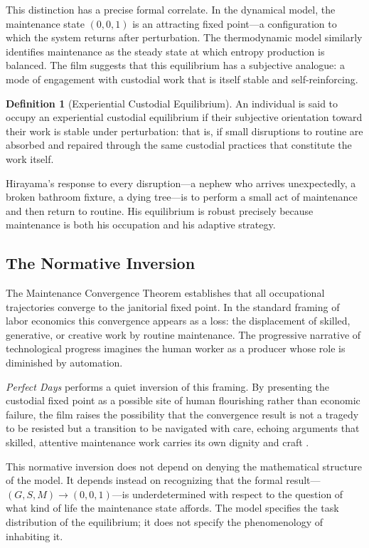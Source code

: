 \documentclass[12pt,a4paper]{article}
\theoremstyle{plain}
\theoremstyle{definition}
\newtheorem{definition}[theorem]{Definition}
\theoremstyle{remark}
\begin{document}
This distinction has a precise formal correlate.  In the dynamical model,
the maintenance state $(0,0,1)$ is an attracting fixed point---a
configuration to which the system returns after perturbation.  The
thermodynamic model similarly identifies maintenance as the steady state at
which entropy production is balanced.  The film suggests that this
equilibrium has a subjective analogue: a mode of engagement with custodial
work that is itself stable and self-reinforcing.

\begin{definition}[Experiential Custodial Equilibrium]
An individual is said to occupy an experiential custodial equilibrium if
their subjective orientation toward their work is stable under perturbation:
that is, if small disruptions to routine are absorbed and repaired through
the same custodial practices that constitute the work itself.
\end{definition}

Hirayama's response to every disruption---a nephew who arrives unexpectedly,
a broken bathroom fixture, a dying tree---is to perform a small act of
maintenance and then return to routine.  His equilibrium is robust precisely
because maintenance is both his occupation and his adaptive strategy.

\subsection{The Normative Inversion}

The Maintenance Convergence Theorem establishes that all occupational
trajectories converge to the janitorial fixed point.  In the standard
framing of labor economics this convergence appears as a loss: the
displacement of skilled, generative, or creative work by routine
maintenance.  The progressive narrative of technological progress imagines
the human worker as a producer whose role is diminished by automation.

\emph{Perfect Days} performs a quiet inversion of this framing.  By
presenting the custodial fixed point as a possible site of human flourishing
rather than economic failure, the film raises the possibility that the
convergence result is not a tragedy to be resisted but a transition to be
navigated with care, echoing arguments that skilled, attentive maintenance
work carries its own dignity and craft \cite{sennett2008,crawford2009}.

This normative inversion does not depend on denying the mathematical
structure of the model.  It depends instead on recognizing that the
formal result---$(G,S,M) \to (0,0,1)$---is underdetermined with respect to
the question of what kind of life the maintenance state affords.  The model
specifies the task distribution of the equilibrium; it does not specify the
phenomenology of inhabiting it.
\end{document}
